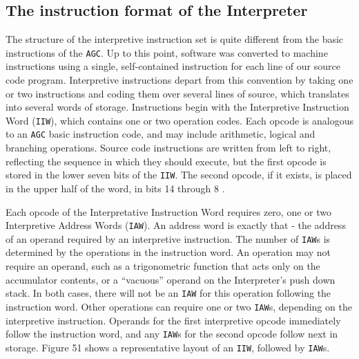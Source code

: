 \documentclass[refcap, oxford]{ahsan}
\begin{document}
\subsection{The instruction format of the Interpreter}

The structure of the interpretive instruction set is quite different from the basic instructions of the \texttt{AGC}. Up to this point, software was converted to machine instructions using a single, self-contained instruction for each line of our source code program. Interpretive instructions depart from this convention by taking one or two instructions and coding them over several lines of source, which translates into several words of storage. Instructions begin with the Interpretive Instruction Word (\texttt{IIW}), which contains one or two operation codes. Each opcode is analogous to an \texttt{AGC} basic instruction code, and may include arithmetic, logical and branching operations. Source code instructions are written from left to right, reflecting the sequence in which they should execute, but the first opcode is stored in the lower seven bits of the \texttt{IIW}. The second opcode, if it exists, is placed in the upper half of the word, in bits 14 through 8 .

Each opcode of the Interpretative Instruction Word requires zero, one or two Interpretive Address Words (\texttt{IAW}). An address word is exactly that - the address of an operand required by an interpretive instruction. The number of \texttt{IAW}s is determined by the operations in the instruction word. An operation may not require an operand, such as a trigonometric function that acts only on the accumulator contents, or a ``vacuous'' operand on the Interpreter's push down stack. In both cases, there will not be an \texttt{IAW} for this operation following the instruction word. Other operations can require one or two \texttt{IAW}s, depending on the interpretive instruction. Operands for the first interpretive opcode immediately follow the instruction word, and any \texttt{IAW}s for the second opcode follow next in storage. Figure 51 shows a representative layout of an \texttt{IIW}, followed by \texttt{IAW}s.

\end{document}

